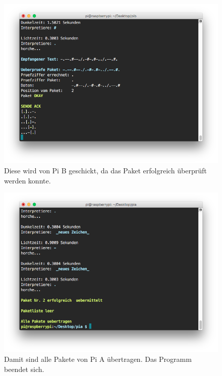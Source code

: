 \documentclass[12pt, a4paper]{article}
\begin{document}
\newpage
\begin{figure}[H]
	\centering
	\includegraphics[width=1.0\textwidth]{sshot_42.png}
	\caption{Diese wird von Pi B geschickt, da das Paket erfolgreich überprüft werden konnte.}
\end{figure}

\newpage
\begin{figure}[H]
	\centering
	\includegraphics[width=1.0\textwidth]{sshot_43.png}
	\caption{Damit sind alle Pakete von Pi A übertragen. Das Programm beendet sich.}
\end{figure}
\end{document}
